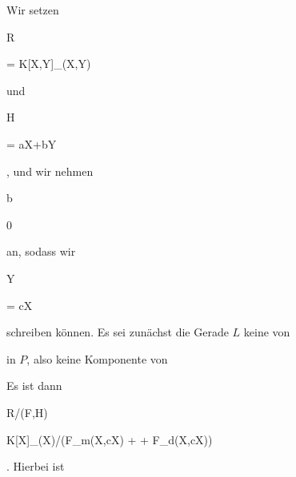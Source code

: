 {


Wir setzen


\mavergleichskette

{\vergleichskette

{R
}

{ = }{ K[X,Y]_{(X,Y)}
}

{  }{
}

{    }{
}

{   }{
}

}
{}{}{}
und


\mavergleichskette

{\vergleichskette

{H
}

{ = }{ aX+bY
}

{  }{
}

{    }{
}

{   }{
}

}
{}{}{,}
und wir nehmen


\mavergleichskette

{\vergleichskette

{b
}

{ \neq }{ 0
}

{  }{
}

{    }{
}

{   }{
}

}
{}{}{}
an, sodass wir


\mavergleichskette

{\vergleichskette

{Y
}

{ = }{ cX
}

{  }{
}

{    }{
}

{   }{
}

}
{}{}{}
schreiben können. Es sei zunächst die Gerade $L$ keine
von

 in $P$, also keine Komponente von

 Es ist dann


\mavergleichskettedisp

{\vergleichskette

{ R/(F,H)
}

{ \cong} {K[X]_{(X)}/(F_m(X,cX) + \cdots + F_d(X,cX))
}

{ } {
}

{ } {
}

{ } {
}

}
{}{}{.}
Hierbei ist


\mavergleichskette

}
